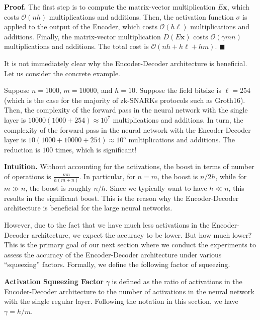 \documentclass{iacrtrans}
\begin{document}
\textbf{Proof.} The first step is to compute the matrix-vector multiplication
$E\mathbf{x}$, which costs $\mathcal{O}(nh)$ multiplications and additions.
Then, the activation function $\sigma$ is applied to the output of the Encoder,
which costs $\mathcal{O}(h\ell)$ multiplications and additions. Finally, the
matrix-vector multiplication $D(E\mathbf{x})$ costs $\mathcal{O}(\gamma mn)$
multiplications and additions. The total cost is $\mathcal{O}(nh+h\ell+hm)$.
$\blacksquare$

It is not immediately clear why the Encoder-Decoder architecture is beneficial.
Let us consider the concrete example.

\begin{example}
    Suppose $n=1000$, $m=10000$, and $h = 10$. Suppose the field bitsize is
    $\ell=254$ (which is the case for the majority of zk-SNARKs protocols such
    as Groth16). Then, the complexity of the forward pass in the neural network
    with the single layer is $10000(1000+254) \approx 10^7$ multiplications and
    additions. In turn, the complexity of the forward pass in the neural network
    with the Encoder-Decoder layer is $10(1000+10000+254) \approx 10^5$
    multiplications and additions. The reduction is $100$ times, which is
    significant!
\end{example}

\textbf{Intuition.} Without accounting for the activations, the boost in terms
of number of operations is $\frac{mn}{h(m+n)}$. In particular,
for $n=m$, the boost is $n/2h$, while for $m \gg n$, the boost is roughly $n/h$.
Since we typically want to have $h \ll n$, this results in the significant
boost. This is the reason why the Encoder-Decoder architecture is beneficial for
the large neural networks.

However, due to the fact that we have much less activations in the
Encoder-Decoder architecture, we expect the accuracy to be lower. But how much
lower? This is the primary goal of our next section where we conduct the
experiments to assess the accuracy of the Encoder-Decoder architecture under
various ``squeezing'' factors. Formally, we define the following factor of 
squeezing.

\begin{definition}
    \textbf{Activation Squeezing Factor} $\gamma$ is defined as the ratio of
    activations in the Encoder-Decoder architecture to the number of activations
    in the neural network with the single regular layer. Following the notation
    in this section, we have $\gamma = h/m$.
\end{definition}
\end{document}

